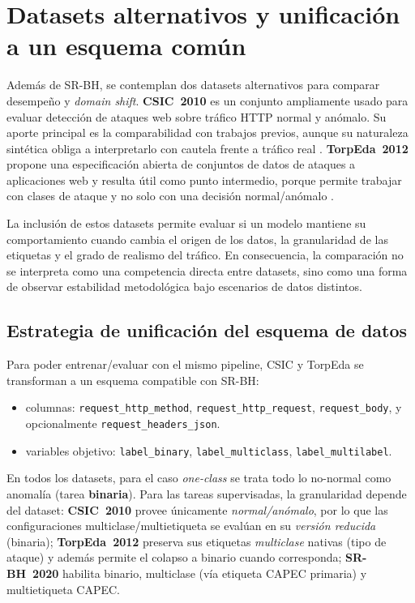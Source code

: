 \documentclass[12pt,oneside]{report}
\begin{document}
\section{Datasets alternativos y unificación a un esquema común}
Además de SR-BH, se contemplan dos datasets alternativos para comparar desempeño y \textit{domain shift}. \textbf{CSIC~2010} es un conjunto ampliamente usado para evaluar detección de ataques web sobre tráfico HTTP normal y anómalo. Su aporte principal es la comparabilidad con trabajos previos, aunque su naturaleza sintética obliga a interpretarlo con cautela frente a tráfico real \cite{csic2010_impact,csic2010_doc}. \textbf{TorpEda~2012} propone una especificación abierta de conjuntos de datos de ataques a aplicaciones web y resulta útil como punto intermedio, porque permite trabajar con clases de ataque y no solo con una decisión normal/anómalo \cite{torpeda_2012}.

La inclusión de estos datasets permite evaluar si un modelo mantiene su comportamiento cuando cambia el origen de los datos, la granularidad de las etiquetas y el grado de realismo del tráfico. En consecuencia, la comparación no se interpreta como una competencia directa entre datasets, sino como una forma de observar estabilidad metodológica bajo escenarios de datos distintos.

\subsection{Estrategia de unificación del esquema de datos}
Para poder entrenar/evaluar con el mismo pipeline, CSIC y TorpEda se transforman a un esquema compatible con SR-BH:
\begin{itemize}[leftmargin=*]
  \item columnas: \texttt{request\_http\_method}, \texttt{request\_http\_request}, \texttt{request\_body}, y opcionalmente \texttt{request\_headers\_json}.
  \item variables objetivo: \texttt{label\_binary}, \texttt{label\_multiclass}, \texttt{label\_multilabel}.
\end{itemize}

En todos los datasets, para el caso \textit{one-class} se trata todo lo no-normal como anomalía (tarea \textbf{binaria}). Para las tareas supervisadas, la granularidad depende del dataset: \textbf{CSIC~2010} provee únicamente \textit{normal/anómalo}, por lo que las configuraciones multiclase/multietiqueta se evalúan en su \textit{versión reducida} (binaria); \textbf{TorpEda~2012} preserva sus etiquetas \textit{multiclase} nativas (tipo de ataque) y además permite el colapso a binario cuando corresponda; \textbf{SR-BH~2020} habilita binario, multiclase (vía etiqueta CAPEC primaria) y multietiqueta CAPEC.
\end{document}
